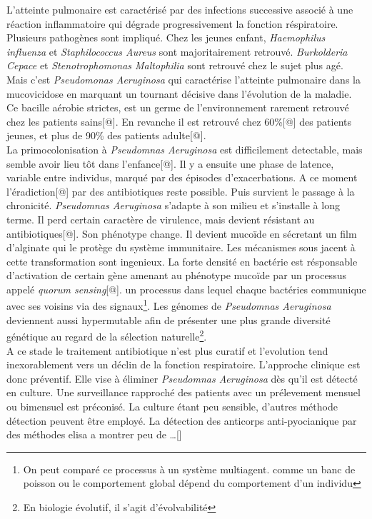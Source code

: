 \documentclass[12pt,a4paper]{article}
\begin{document}
L’atteinte pulmonaire est caractérisé par des infections successive associé à une réaction inflammatoire qui dégrade progressivement la fonction réspiratoire.
Plusieurs pathogènes sont impliqué. Chez les jeunes enfant, \textit{Haemophilus influenza} et \textit{Staphilococcus Aureus} sont majoritairement retrouvé. \textit{Burkolderia Cepace} et \textit{Stenotrophomonas Maltophilia} sont retrouvé chez le sujet plus agé.
Mais c’est \textit{Pseudomonas Aeruginosa} qui caractérise l’atteinte pulmonaire dans la mucovicidose en marquant un tournant décisive dans l’évolution de la maladie. Ce bacille aérobie strictes, est un germe de l'environnement rarement retrouvé chez les patients sains[@]. En revanche il est retrouvé chez 60\%[@] des patients jeunes, et plus de 90\% des patients adulte[@].\\
La primocolonisation à \textit{Pseudomnas Aeruginosa} est difficilement detectable, mais semble avoir lieu tôt dans l’enfance[@]. Il y a ensuite une phase de latence, variable entre individus, marqué par des épisodes d’exacerbations. A ce moment l’éradiction[@] par des antibiotiques reste possible.
Puis survient le passage à la chronicité. \textit{Pseudomnas Aeruginosa} s'adapte à son milieu et s’installe à long terme. Il perd certain caractère de virulence, mais devient résistant au antibiotiques[@]. Son phénotype change. Il devient mucoïde en sécretant un film d’alginate qui le protège du système immunitaire. Les mécanismes sous jacent à cette transformation sont ingenieux. La forte densité en bactérie est résponsable d’activation de certain gène amenant au phénotype mucoïde par un processus appelé \textit{quorum sensing}[@]. un processus dans lequel chaque bactéries communique avec ses voisins via des signaux\footnote{On peut comparé ce processus à un système multiagent. comme un banc de poisson ou le comportement global dépend du comportement d’un individu}.
Les génomes de \textit{Pseudomnas Aeruginosa} deviennent aussi hypermutable afin de présenter une plus grande diversité génétique au regard de la sélection naturelle\footnote{En biologie évolutif, il s'agit d'évolvabilité}. \\
A ce stade le traitement antibiotique n’est plus curatif et l'evolution tend inexorablement vers un déclin de la fonction respiratoire.
L'approche clinique est donc préventif. Elle  vise à éliminer \textit{Pseudomnas Aeruginosa} dès qu’il est détecté en culture. Une surveillance rapproché des patients avec un prélevement mensuel ou bimensuel est préconisé. La culture étant peu sensible, d’autres méthode détection peuvent être employé. La détection des anticorps anti-pyocianique par des méthodes elisa a montrer peu de …[]
\end{document}

